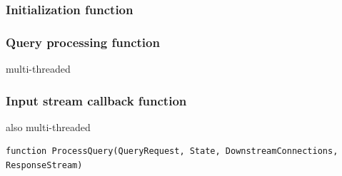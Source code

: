 




\subsubsection{Initialization function}
\label{sec:initialization_func}


\subsubsection{Query processing function}
\label{sec:query_processing_func}
multi-threaded


\subsubsection{Input stream callback function}
\label{sec:callback_func}
also multi-threaded



\begin{lstlisting}[caption={Query processing function signature},captionpos=b,label={lst:query_processing_func}]
function ProcessQuery(QueryRequest, State, DownstreamConnections, ResponseStream)
\end{lstlisting}

